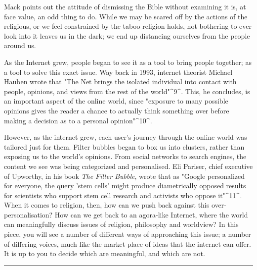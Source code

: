 \documentclass[]{article}
\begin{document}
Mack points out the attitude of dismissing the Bible without examining
it is, at face value, an odd thing to do. While we may be scared off by
the actions of the religious, or we feel constrained by the taboo
religion holds, not bothering to ever look into it leaves us in the
dark; we end up distancing ourselves from the people around us.

As the Internet grew, people began to see it as a tool to bring people
together; as a tool to solve this exact issue. Way back in 1993,
internet theorist Michael Hauben wrote that "The Net brings the isolated
individual into contact with people, opinions, and views from the rest
of the world"\^{}9\^{}. This, he concludes, is an important aspect of
the online world, since "exposure to many possible opinions gives the
reader a chance to actually think something over before making a
decision as to a personal opinion"\^{}10\^{}.

However, as the internet grew, each user's journey through the online
world was tailored just for them. Filter bubbles began to box us into
clusters, rather than exposing us to the world's opinions. From social
networks to search engines, the content we see was being categorized and
personalised. Eli Pariser, chief executive of Upworthy, in his book
\emph{The Filter Bubble}, wrote that as "Google personalized for
everyone, the query 'stem cells' might produce diametrically opposed
results for scientists who support stem cell research and activists who
oppose it"\^{}11\^{}. When it comes to religion, then, how can we push
back against this over-personalisation? How can we get back to an
agora-like Internet, where the world can meaningfully discuss issues of
religion, philosophy and worldview? In this piece, you will see a number
of different ways of approaching this issue; a number of differing
voices, much like the market place of ideas that the internet can offer.
It is up to you to decide which are meaningful, and which are not.

\begin{center}\rule{0.5\linewidth}{\linethickness}\end{center}
\end{document}
